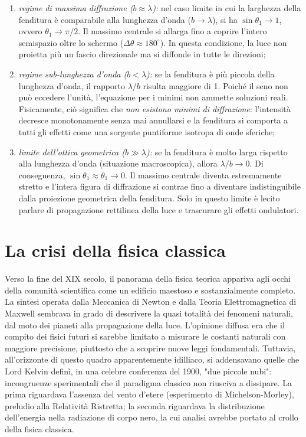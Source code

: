 \documentclass[a4paper,11pt]{report}
\begin{document}
\begin{enumerate}
    \item \textit{regime di massima diffrazione ($b \approx \lambda$):}
    nel caso limite in cui la larghezza della fenditura è comparabile alla lunghezza d'onda ($b \to \lambda$), si ha $\sin \theta_1 \to 1$, ovvero $\theta_1 \to \pi/2$.
    Il massimo centrale si allarga fino a coprire l'intero semispazio oltre lo schermo ($\Delta\theta \approx 180^\circ$). In questa condizione, la luce non proietta più un fascio direzionale ma si diffonde in tutte le direzioni;

    \item \textit{regime sub-lunghezza d'onda ($b < \lambda$):}
    se la fenditura è più piccola della lunghezza d'onda, il rapporto $\lambda/b$ risulta maggiore di 1. Poiché il seno non può eccedere l'unità, l'equazione per i minimi non ammette soluzioni reali.
    Fisicamente, ciò significa che \textit{non esistono minimi di diffrazione}: l'intensità decresce monotonamente senza mai annullarsi e la fenditura si comporta a tutti gli effetti come una sorgente puntiforme isotropa di onde sferiche;

    \item \textit{limite dell'ottica geometrica ($b \gg \lambda$):}
    se la fenditura è molto larga rispetto alla lunghezza d'onda (situazione macroscopica), allora $\lambda/b \to 0$. Di conseguenza, $\sin\theta_1 \approx \theta_1 \to 0$.
    Il massimo centrale diventa estremamente stretto e l'intera figura di diffrazione si contrae fino a diventare indistinguibile dalla proiezione geometrica della fenditura. Solo in questo limite è lecito parlare di propagazione rettilinea della luce e trascurare gli effetti ondulatori.
\end{enumerate}










\chapter{La crisi della fisica classica}
Verso la fine del XIX secolo, il panorama della fisica teorica appariva agli occhi della comunità scientifica come un edificio maestoso e sostanzialmente completo. La sintesi operata dalla Meccanica di Newton e dalla Teoria Elettromagnetica di Maxwell sembrava in grado di descrivere la quasi totalità dei fenomeni naturali, dal moto dei pianeti alla propagazione della luce. L'opinione diffusa era che il compito dei fisici futuri si sarebbe limitato a misurare le costanti naturali con maggiore precisione, piuttosto che a scoprire nuove leggi fondamentali.
Tuttavia, all'orizzonte di questo quadro apparentemente idilliaco, si addensavano quelle che Lord Kelvin definì, in una celebre conferenza del 1900, "due piccole nubi": incongruenze sperimentali che il paradigma classico non riusciva a dissipare.
La prima riguardava l'assenza del vento d'etere (esperimento di Michelson-Morley), preludio alla Relatività Ristretta; la seconda riguardava la distribuzione dell'energia nella radiazione di corpo nero, la cui analisi avrebbe portato al crollo della fisica classica.
\end{document}

